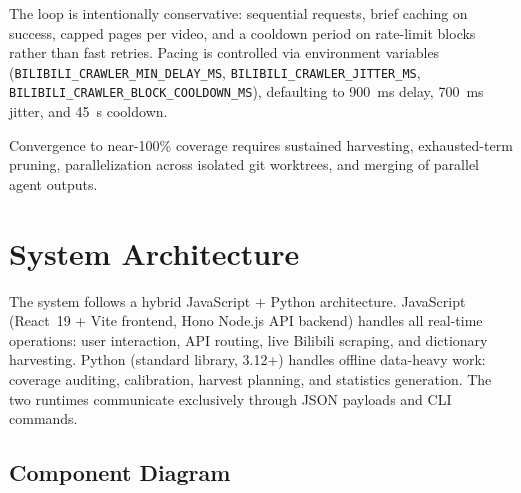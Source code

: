 \documentclass[11pt,a4paper]{article}
\begin{document}
The loop is intentionally conservative: sequential requests, brief caching on
success, capped pages per video, and a cooldown period on rate-limit blocks
rather than fast retries. Pacing is controlled via environment variables
(\texttt{BILIBILI\_CRAWLER\_MIN\_DELAY\_MS}, \texttt{BILIBILI\_CRAWLER\_JITTER\_MS},
\texttt{BILIBILI\_CRAWLER\_BLOCK\_COOLDOWN\_MS}), defaulting to 900~ms delay,
700~ms jitter, and 45~s cooldown.

Convergence to near-100\% coverage requires sustained harvesting, exhausted-term
pruning, parallelization across isolated git worktrees, and merging of parallel
agent outputs.


\section{System Architecture}

The system follows a hybrid JavaScript + Python architecture. JavaScript
(React~19 + Vite frontend, Hono Node.js API backend) handles all real-time
operations: user interaction, API routing, live Bilibili scraping, and
dictionary harvesting. Python (standard library, 3.12+) handles offline
data-heavy work: coverage auditing, calibration, harvest planning, and
statistics generation. The two runtimes communicate exclusively through
JSON payloads and CLI commands.

\subsection{Component Diagram}
\end{document}
